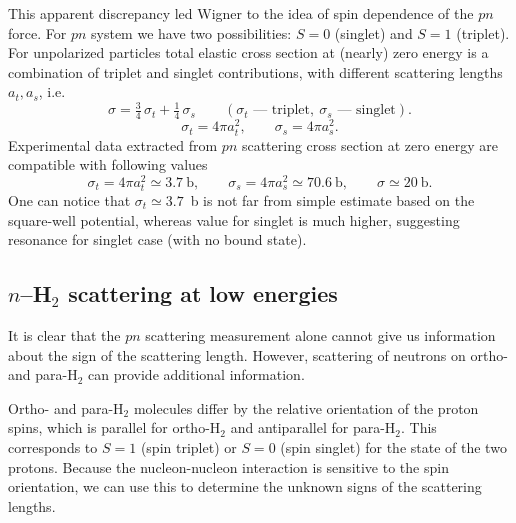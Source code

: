 \documentclass[11pt,a4paper]{article}
\begin{document}
This apparent discrepancy led Wigner to the idea of spin dependence of the $pn$ force. For $pn$ system we have two possibilities:
$S=0$ (singlet) and $S=1$ (triplet). For unpolarized particles total elastic cross section at (nearly) zero energy is a combination of triplet and singlet contributions, with different scattering lengths $a_t, a_s$, i.e. 
\[
\sigma=\tfrac34\,\sigma_t+\tfrac14\,\sigma_s
\qquad(\sigma_t \text{ --- triplet},\ \sigma_s \text{ --- singlet}).
\]
\[
\sigma_t=4\pi a_t^2,\qquad \sigma_s=4\pi a_s^2.
\]
Experimental data extracted from $pn$ scattering cross section at zero energy are compatible with following values    
\[
\sigma_t=4\pi a_t^2\simeq3.7\ \text{b} ,
\qquad
\sigma_s=4\pi a_s^2\simeq70.6\ \text{b},
\qquad
\sigma\simeq20\ \text{b}.
\]
One can notice that $\sigma_t\simeq3.7$~b is not far from simple estimate based on the square-well potential, whereas value for singlet is much higher, suggesting resonance for singlet case (with no bound state).
\subsection{\texorpdfstring{$n$--H$_2$}{n-H2} scattering at low energies}
It is clear that the $pn$ scattering measurement alone cannot give us information about the sign of the scattering length. 
However, scattering of neutrons on ortho- and para-H$_2$ can provide additional information. 

Ortho- and para-H$_2$ molecules differ by the relative orientation of the proton spins, which is parallel for ortho-H$_2$ and antiparallel for para-H$_2$. This corresponds to $S=1$ (spin triplet) or $S=0$ (spin singlet) for the state of the two protons. Because the nucleon-nucleon interaction is sensitive to the spin orientation, we can use this to determine the unknown signs of the scattering lengths. 
\begin{center}
\end{center}
\end{document}
